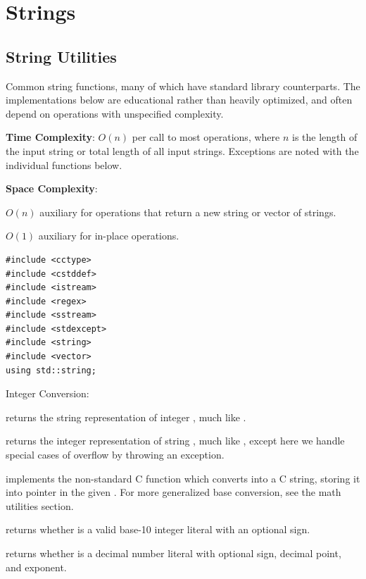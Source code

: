\chapter{\texorpdfstring{Strings}{3. Strings}}

\section{\texorpdfstring{String Utilities}{3.1 String Utilities}}
\setcounter{section}{1}
\label{sec:3.1}
Common string functions, many of which have standard library counterparts. The implementations below are educational rather than heavily optimized, and often depend on  operations with unspecified complexity.

\textbf{Time Complexity}: $O(n)$ per call to most operations, where $n$ is the length of the input string or total length of all input strings. Exceptions are noted with the individual functions below.

\textbf{Space Complexity}:
\begin{compactitem}
  \item $O(n)$ auxiliary for operations that return a new string or vector of strings.
  \item $O(1)$ auxiliary for in-place operations.
\end{compactitem}

\begin{lstlisting}[style=cpp]
#include <cctype>
#include <cstddef>
#include <istream>
#include <regex>
#include <sstream>
#include <stdexcept>
#include <string>
#include <vector>
using std::string;
\end{lstlisting}
Integer Conversion:

\begin{compactitem}
  \item {} returns the string representation of integer , much like .
  \item {} returns the integer representation of string , much like , except here we handle special cases of overflow by throwing an exception.
  \item {} implements the non-standard C function which converts  into a C string, storing it into pointer  in the given . For more generalized base conversion, see the math utilities section.
  \item {} returns whether  is a valid base-10 integer literal with an optional sign.
  \item {} returns whether  is a decimal number literal with optional sign, decimal point, and exponent.
\end{compactitem}

